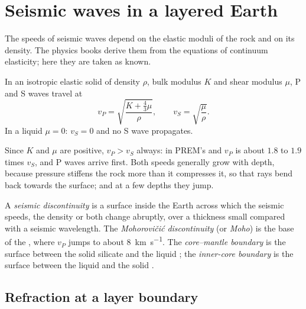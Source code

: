 \section{Seismic waves in a layered Earth}

The speeds of seismic waves depend on the elastic moduli of the rock and on
its density. The physics books derive them from the equations of continuum
elasticity; here they are taken as known.

\begin{proposition}\label{prop:b1:layered-earth:speeds}
In an isotropic elastic solid of density $\rho$, bulk modulus $K$ and shear
modulus $\mu$, P and S waves travel at
\[
  v_P = \sqrt{\frac{K + \tfrac43\mu}{\rho}}, \qquad v_S = \sqrt{\frac{\mu}{\rho}}.
\]
In a liquid $\mu = 0$: $v_S = 0$ and no S wave propagates.
\end{proposition}
\admitted

Since $K$ and $\mu$ are positive, $v_P > v_S$ always: in PREM's  and
 $v_P$ is about $1.8$ to $1.9$ times $v_S$, and P waves arrive first. Both speeds
generally grow with depth, because pressure stiffens the rock more than it
compresses it, so that rays bend back towards the surface; and at a few depths
they jump.

\begin{definition}
\label{def:b1:layered-earth:discontinuity}
A \emph{seismic discontinuity} is a surface
inside the Earth across which the seismic speeds, the density or both change
abruptly, over a thickness small compared with a seismic wavelength. The
\emph{Mohorovičić discontinuity} (or
\emph{Moho}) is the base of the , where $v_P$ jumps to about
\qty{8}{km.s^{-1}}. The \emph{core--mantle boundary} is the surface between the solid silicate  and the liquid
; the \emph{inner-core boundary} is the
surface between the liquid  and the solid .
\end{definition}

\subsection{Refraction at a layer boundary}

